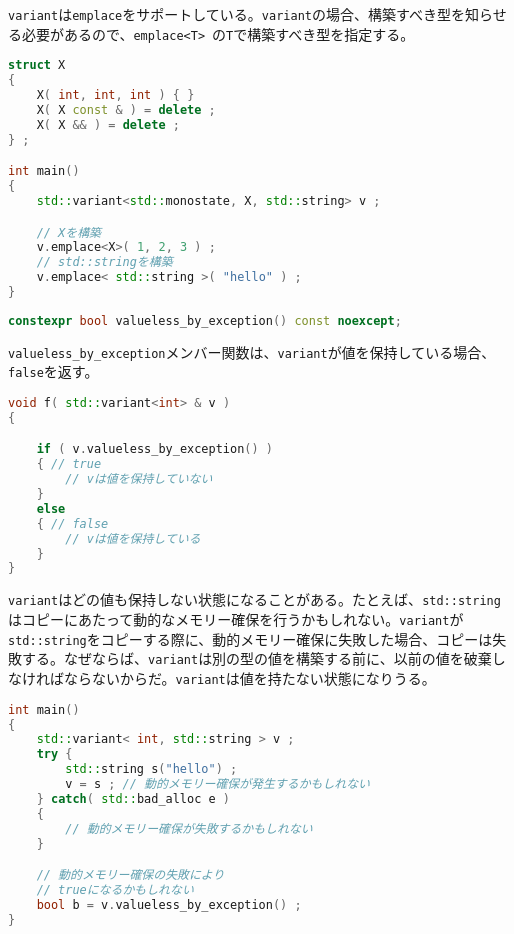 \lstinline!variant!は\lstinline!emplace!をサポートしている。\lstinline!variant!の場合、構築すべき型を知らせる必要があるので、\lstinline!emplace<T>!~の\lstinline!T!で構築すべき型を指定する。

\begin{lstlisting}[language=C++]
struct X
{
    X( int, int, int ) { }
    X( X const & ) = delete ;
    X( X && ) = delete ; 
} ;

int main()
{
    std::variant<std::monostate, X, std::string> v ;

    // Xを構築
    v.emplace<X>( 1, 2, 3 ) ;
    // std::stringを構築
    v.emplace< std::string >( "hello" ) ;
}
\end{lstlisting}

%

%

\bgroup
\begin{lstlisting}[language=C++]
constexpr bool valueless_by_exception() const noexcept;
\end{lstlisting}
\egroup

\lstinline!valueless_by_exception!メンバー関数は、\lstinline!variant!が値を保持している場合、\lstinline!false!を返す。

\begin{lstlisting}[language=C++]
void f( std::variant<int> & v )
{

    if ( v.valueless_by_exception() ) 
    { // true
        // vは値を保持していない
    }
    else
    { // false
        // vは値を保持している
    }
}
\end{lstlisting}

\lstinline!variant!はどの値も保持しない状態になることがある。たとえば、\lstinline!std::string!はコピーにあたって動的なメモリー確保を行うかもしれない。\lstinline!variant!が\lstinline!std::string!をコピーする際に、動的メモリー確保に失敗した場合、コピーは失敗する。なぜならば、\lstinline!variant!は別の型の値を構築する前に、以前の値を破棄しなければならないからだ。\lstinline!variant!は値を持たない状態になりうる。

\begin{lstlisting}[language=C++]
int main()
{
    std::variant< int, std::string > v ;
    try {
        std::string s("hello") ;
        v = s ; // 動的メモリー確保が発生するかもしれない
    } catch( std::bad_alloc e )
    {
        // 動的メモリー確保が失敗するかもしれない
    }

    // 動的メモリー確保の失敗により
    // trueになるかもしれない
    bool b = v.valueless_by_exception() ;
}
\end{lstlisting}

